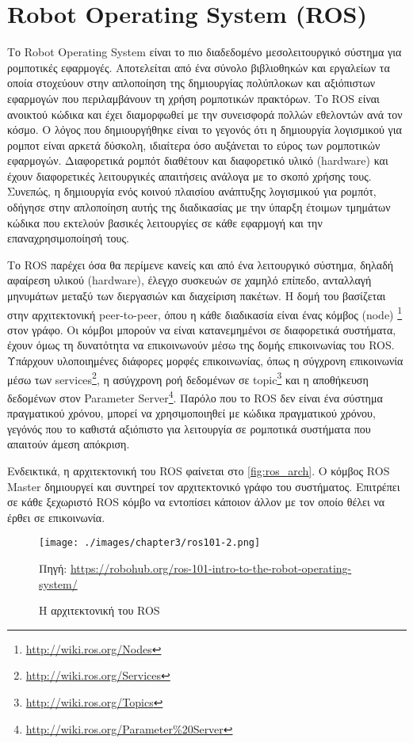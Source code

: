 \section{Robot Operating System (ROS)}
\label{section:ROS}

Το Robot Operating System \cite{ros2009} είναι το πιο διαδεδομένο μεσολειτουργικό σύστημα για ρομποτικές εφαρμογές. Αποτελείται από ένα σύνολο βιβλιοθηκών και εργαλείων τα οποία στοχεύουν στην απλοποίηση της δημιουργίας πολύπλοκων και αξιόπιστων εφαρμογών που περιλαμβάνουν τη χρήση ρομποτικών πρακτόρων. Το ROS είναι ανοικτού κώδικα και έχει διαμορφωθεί με την συνεισφορά πολλών εθελοντών ανά τον κόσμο. Ο λόγος που δημιουργήθηκε είναι το γεγονός ότι η δημιουργία λογισμικού για ρομποτ είναι αρκετά δύσκολη, ιδιαίτερα όσο αυξάνεται το εύρος των ρομποτικών εφαρμογών. Διαφορετικά ρομπότ διαθέτουν και διαφορετικό υλικό (hardware) και έχουν διαφορετικές λειτουργικές απαιτήσεις ανάλογα με το σκοπό χρήσης τους. Συνεπώς, η δημιουργία ενός κοινού πλαισίου ανάπτυξης λογισμικού για ρομπότ, οδήγησε στην απλοποίηση αυτής της διαδικασίας με την ύπαρξη έτοιμων τμημάτων κώδικα που εκτελούν βασικές λειτουργίες σε κάθε εφαρμογή και την επαναχρησιμοποίησή τους.

Το ROS παρέχει όσα θα περίμενε κανείς και από ένα λειτουργικό σύστημα, δηλαδή αφαίρεση υλικού (hardware), έλεγχο συσκευών σε χαμηλό επίπεδο, ανταλλαγή μηνυμάτων μεταξύ των διεργασιών και διαχείριση πακέτων. Η δομή του βασίζεται στην αρχιτεκτονική peer-to-peer, όπου η κάθε διαδικασία είναι ένας κόμβος (node) \footnote{\href{http://wiki.ros.org/Nodes}{http://wiki.ros.org/Nodes}} στον γράφο. Οι κόμβοι μπορούν να είναι κατανεμημένοι σε διαφορετικά συστήματα, έχουν όμως τη δυνατότητα να επικοινωνούν μέσω της δομής επικοινωνίας του ROS. Υπάρχουν υλοποιημένες διάφορες μορφές επικοινωνίας, όπως η σύγχρονη επικοινωνία μέσω των services\footnote{\href{http://wiki.ros.org/Services}{http://wiki.ros.org/Services}}, η ασύγχρονη ροή δεδομένων σε topic\footnote{\href{http://wiki.ros.org/Topics}{http://wiki.ros.org/Topics}} και η αποθήκευση δεδομένων στον Parameter Server\footnote{\href{http://wiki.ros.org/Parameter\%20Server}{http://wiki.ros.org/Parameter\%20Server}}. Παρόλο που το ROS δεν είναι ένα σύστημα πραγματικού χρόνου, μπορεί να χρησιμοποιηθεί με κώδικα πραγματικού χρόνου, γεγόνός που το καθιστά αξιόπιστο για λειτουργία σε ρομποτικά συστήματα που απαιτούν άμεση απόκριση.

Ενδεικτικά, η αρχιτεκτονική του ROS φαίνεται στο \autoref{fig:ros_arch}. Ο κόμβος ROS Master δημιουργεί και συντηρεί τον αρχιτεκτονικό γράφο του συστήματος. Επιτρέπει σε κάθε ξεχωριστό ROS κόμβο να εντοπίσει κάποιον άλλον με τον οποίο θέλει να έρθει σε επικοινωνία.

\begin{figure}[!ht]
    \centering
    \texttt{[image: ./images/chapter3/ros101-2.png]}
    \caption{Η αρχιτεκτονική του ROS} 
    Πηγή: \href{https://robohub.org/ros-101-intro-to-the-robot-operating-system/}{https://robohub.org/ros-101-intro-to-the-robot-operating-system/}
    \label{fig:ros_arch}
\end{figure}

